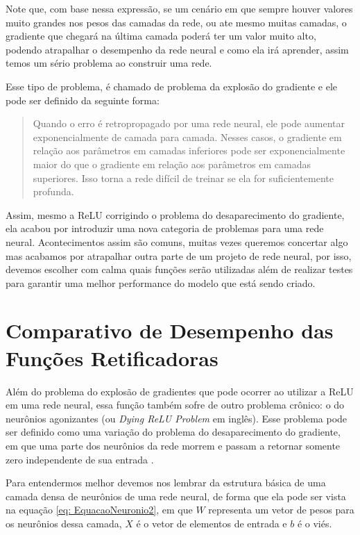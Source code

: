 Note que, com base nessa expressão, se um cenário em que sempre houver valores muito grandes nos pesos das camadas da rede, ou ate mesmo muitas camadas, o gradiente que chegará na última camada poderá ter um valor muito alto, podendo atrapalhar o desempenho da rede neural e como ela irá aprender, assim temos um sério problema ao construir uma rede.

Esse tipo de problema, é chamado de problema da explosão do gradiente e ele pode ser definido da seguinte forma:

\begin{quote}
    Quando o erro é retropropagado por uma rede neural, ele pode aumentar exponencialmente de camada para camada. Nesses casos, o gradiente em relação aos parâmetros em camadas inferiores pode ser exponencialmente maior do que o gradiente em relação aos parâmetros em
    camadas superiores. Isso torna a rede difícil de treinar se ela for suficientemente profunda.
\end{quote}

\parencite[p.~2]{explodingGradient}

Assim, mesmo a ReLU corrigindo o problema do desaparecimento do gradiente, ela acabou por introduzir uma nova categoria de problemas para uma rede neural. Acontecimentos assim são comuns, muitas vezes queremos concertar algo mas acabamos por atrapalhar outra parte de um projeto de rede neural, por isso, devemos escolher com calma quais funções serão utilizadas além de realizar testes para garantir uma melhor performance do modelo que está sendo criado.

\section{Comparativo de Desempenho das Funções Retificadoras}

Além do problema do explosão de gradientes que pode ocorrer ao utilizar a ReLU em uma rede neural, essa função também sofre de outro problema crônico: o do neurônios agonizantes (ou \textit{Dying ReLU Problem} em inglês). Esse problema pode ser definido como uma variação do problema do desaparecimento do gradiente, em que uma parte dos neurônios da rede morrem e passam a retornar somente zero independente de sua entrada \parencite{dyingReLU}.

Para entendermos melhor devemos nos lembrar da estrutura básica de uma camada densa de neurônios de uma rede neural, de forma que ela pode ser vista na equação \ref{eq: EquacaoNeuronio2}, em que $W$ representa um vetor de pesos para os neurônios dessa camada, $X$ é o vetor de elementos de entrada e $b$ é o viés.

